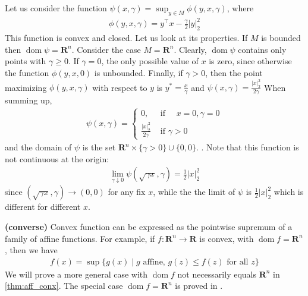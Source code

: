 \documentclass{article}
\newcommand{\bfs}[1]{\textbf{({#1}) }}
\newcommand{\dom}{\operatorname{dom}}
\begin{document}
\begin{exma}\label{rema:cvnaacc}
Let us consider the function $\psi(x, \gamma)=\sup _{y \in M} \phi(y, x, \gamma)$, where
\begin{align*}
\phi(y, x, \gamma)=y^{\top} x-\frac{\gamma}{2}|y|_{2}^{2}
\end{align*}
This function is convex and closed. Let us look at its properties.
If $M$ is bounded then $\dom \psi=\mathbf{R}^{n}$. Consider the case $M=\mathbf{R}^{n} .$ Clearly,  $\dom \psi$ contains only points with $\gamma \geq 0$. If $\gamma=0$, the only possible value of $x$ is zero, since otherwise the function $\phi(y, x, 0)$ is unbounded. Finally, if $\gamma>0$, then the point maximizing $\phi(y, x, \gamma)$ with respect to $y$ is $y^{*}=\frac{x}{\gamma}$ and $\psi(x, \gamma)=\frac{|x|_{2}^{2}}{2 \gamma}$
When summing up,
\begin{align*}
\psi(x, \gamma)= \begin{cases}0, & \text { if } \quad x=0, \gamma=0 \\ \frac{|x|_{2}^{2}}{2 \gamma} & \text { if } \gamma>0\end{cases}
\end{align*}
and the domain of $\psi$ is the set $\mathbf{R}^{n} \times\{\gamma>0\} \cup\{0,0\}$. . Note that this function is not continuous at the origin:
\begin{align*}
\lim _{\gamma \downarrow 0} \psi(\sqrt{\gamma x}, \gamma)=\frac{1}{2}|x|_{2}^{2}
\end{align*}
since $(\sqrt{\gamma x}, \gamma)\to (0,0)$ for any fix $x$, while the the limit of $\psi$ is $\frac{1}{2}|x|_{2}^{2}$ which is different for different $x$.
\end{exma}

\begin{rema}{\bfs{converse}}\label{rem:ggab4wwsd}
Convex function can be expressed as the pointwise supremum of a family of affine functions. For example, if $f: \mathbf{R}^{n} \rightarrow \mathbf{R}$ is convex, with $\dom  f=\mathbf{R}^{n}$, then we have
\begin{align*}
f(x)=\sup \{g(x) \mid g \text { affine, } g(z) \leq f(z) \text { for all } z\}
\end{align*}
We will prove a more general case with $\dom f$ not necessarily equals $\mathbf{R}^n$ in \cref{thm:aff_conx}. The special case $\dom f=\mathbf{R}^n$ is proved in \cite[Page 83]{boyd2004convex}.
\end{rema}
\end{document}
